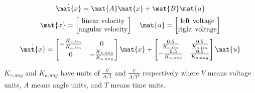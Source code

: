 \begin{theorem}
  \begin{equation*}
    \dot{\mat{x}} = \mat{A}\mat{x} + \mat{B}\mat{u}
  \end{equation*}
  \begin{equation*}
    \mat{x} =
    \begin{bmatrix}
      \text{linear velocity} \\
      \text{angular velocity}
    \end{bmatrix}
    \quad
    \mat{u} =
    \begin{bmatrix}
      \text{left voltage} \\
      \text{right voltage}
    \end{bmatrix}
  \end{equation*}
  \begin{equation*}
    \dot{\mat{x}} =
    \begin{bmatrix}
      -\frac{K_{v,lin}}{K_{a,lin}} & 0 \\
      0 & -\frac{K_{v,ang}}{K_{a,ang}}
    \end{bmatrix} \mat{x} +
    \begin{bmatrix}
      \frac{0.5}{K_{a,lin}} & \frac{0.5}{K_{a,lin}} \\
      -\frac{0.5}{K_{a,ang}} & \frac{0.5}{K_{a,ang}}
    \end{bmatrix} \mat{u}
  \end{equation*}

  $K_{v,ang}$ and $K_{a,ang}$ have units of $\frac{V}{A/T}$ and
  $\frac{V}{A/T^2}$ respectively where $V$ means voltage units, $A$ means angle
  units, and $T$ means time units.
\end{theorem}
